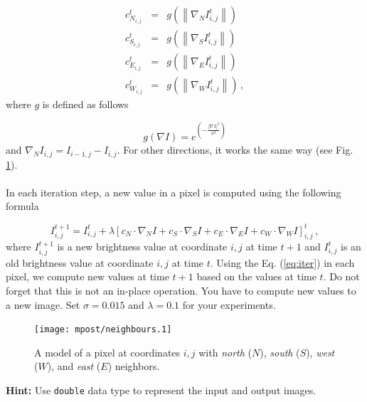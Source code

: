 \documentclass[12pt]{article}
\begin{document}
\begin{eqnarray} \label{eq:conduct}
    c_{N_{i,j}}^{t} &=& g \left(\left\|\nabla_N I_{i,j}^{t}\right\|\right) \nonumber \\
    c_{S_{i,j}}^{t} &=& g \left(\left\|\nabla_S I_{i,j}^{t}\right\|\right) \nonumber \\
    c_{E_{i,j}}^{t} &=& g \left(\left\|\nabla_E I_{i,j}^{t}\right\|\right) \nonumber \\
    c_{W_{i,j}}^{t} &=& g \left(\left\|\nabla_W I_{i,j}^{t}\right\|\right) \, ,
\end{eqnarray}
where $g$ is defined as follows

\begin{equation}
    g(\nabla I) = e^{\left(-\frac{\left| \nabla I\right|^2}{\sigma^2}\right)}
\end{equation}
and $\nabla_N I_{i,j} = I_{i-1,j} - I_{i,j}$. For other directions, it works the same way (see Fig. \ref{fig:neighborhood}).
\\
\\
\noindent
In each iteration step, a new value in a pixel is computed using the following formula


\begin{equation} \label{eq:iter}
    I_{i,j}^{t+1} = I_{i,j}^{t} + \lambda \left[ c_N \cdot \nabla_N I + c_S \cdot \nabla_S I + c_E \cdot \nabla_E I + c_W \cdot \nabla_W I \right]_{i,j}^{t} \, ,
\end{equation}
where $I_{i,j}^{t+1}$ is a new brightness value at coordinate $i,j$ at time $t+1$ and $I_{i,j}^t$ is an old brightness
value at coordinate $i,j$ at time $t$. Using the Eq. (\ref{eq:iter}) in each pixel, we compute new values at time $t+1$
based on the values at time $t$. Do not forget that this is not an in-place operation. You have to compute new values
to a new image.
\newline
\newline
Set $\sigma = 0.015$ and $\lambda = 0.1$ for your experiments.
\newline
\begin{figure}
    \centering
    \texttt{[image: mpost/neighbours.1]}
    \caption{A model of a pixel at coordinates $i,j$ with \textit{north} ($N$), \textit{south} ($S$), \textit{west} ($W$),
    and \textit{east} ($E$) neighbors.}
    \label{fig:neighborhood}
\end{figure}

\noindent
\textbf{Hint:} Use \texttt{double} data type to represent the input and output images.

\end{document}
